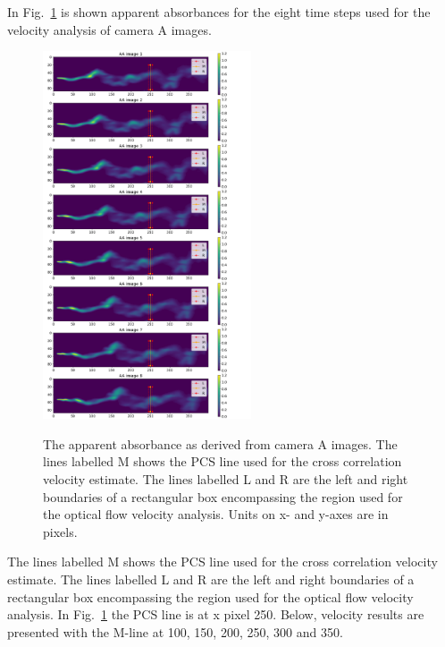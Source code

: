 \documentclass[amtd, manuscript]{copernicus}
\begin{document}
In Fig.~\ref{fig:Fig_Image_LocA} is shown apparent absorbances for the
eight time steps used for the velocity analysis of camera A images.
\begin{figure}[!htb]
  \begin{center}
    \includegraphics[width=0.55\textwidth]{Fig_Image_LocA.png}\\
    \caption{\label{fig:Fig_Image_LocA}
      The apparent absorbance as derived from  camera A images.
      The lines labelled M shows the PCS line used for the cross correlation
      velocity estimate. The lines labelled L and R are the left  and right
      boundaries of a rectangular box encompassing the  region used for the
      optical flow velocity analysis.
      Units on x- and y-axes are in pixels.
    }
  \end{center}
\end{figure}
The lines labelled M shows the PCS line used for the cross correlation
velocity estimate. The lines labelled L and R are the left  and right
boundaries of a rectangular box encompassing the  region used for the
optical flow velocity analysis. In Fig.~\ref{fig:Fig_Image_LocA} the
PCS line is at x pixel 250. Below, velocity results are presented with
the M-line at 100, 150, 200, 250, 300 and 350.
\end{document}
